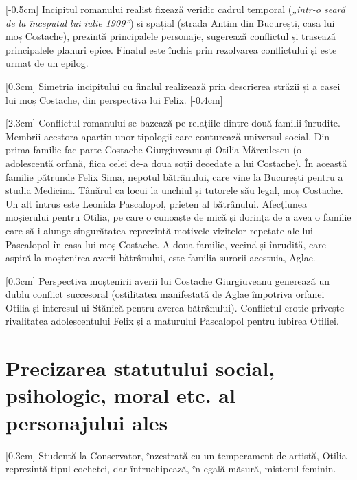 \documentclass[
12pt,
a4paper
]{article}
\begin{document}
[-0.5cm]
Incipitul romanului realist fixează veridic cadrul temporal (\textit{„într-o seară de la începutul lui iulie 1909”}) și spațial (strada Antim din București, casa lui moș Costache), prezintă principalele personaje, sugerează conflictul și trasează principalele planuri epice. Finalul este închis prin rezolvarea conflictului și este urmat de un epilog.

\marginnote{                                            }[0.3cm]
Simetria incipitului cu finalul realizează prin descrierea străzii și a casei lui moș Costache, din perspectiva lui Felix.
[-0.4cm]

[2.3cm]
Conflictul romanului se bazează pe relațiile dintre două familii înrudite. Membrii acestora aparțin unor tipologii care conturează universul social. Din prima familie fac parte Costache Giurgiuveanu și Otilia Mărculescu (o adolescentă orfană, fiica celei de-a doua soții decedate a lui Costache). În această familie pătrunde Felix Sima, nepotul bătrânului, care vine la București pentru a studia Medicina. Tânărul ca locui la unchiul și tutorele său legal, moș Costache. Un alt intrus este Leonida Pascalopol, prieten al bătrânului. Afecțiunea moșierului pentru Otilia, pe care o cunoaște de mică și dorința de a avea o familie care să-i alunge singurătatea reprezintă motivele vizitelor repetate ale lui Pascalopol în casa lui moș Costache. A doua familie, vecină și înrudită, care aspiră la moștenirea averii bătrânului, este familia surorii acestuia, Aglae.

[0.3cm]
Perspectiva moștenirii averii lui Costache Giurgiuveanu generează un dublu conflict succesoral (ostilitatea manifestată de Aglae împotriva orfanei Otilia și interesul ui Stănică pentru averea bătrânului). Conflictul erotic privește rivalitatea adolescentului Felix și a maturului Pascalopol pentru iubirea Otiliei.

\section{Precizarea statutului social, psihologic, moral etc. al personajului ales}

[0.3cm]
Studentă la Conservator, înzestrată cu un temperament de artistă, Otilia reprezintă tipul cochetei, dar întruchipează, în egală măsură, misterul feminin.
\end{document}
